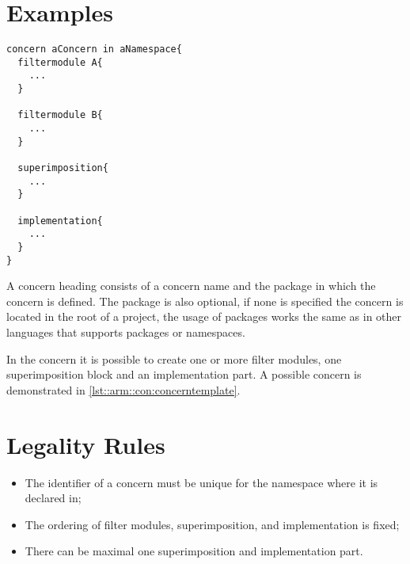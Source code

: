 \section*{Examples}
\begin{lstlisting}[language={Composestar},style=floatlisting, caption={Abstract example of a concern},label={lst::arm::con:concerntemplate}, floatplacement=tbp]
concern aConcern in aNamespace{
  filtermodule A{
    ...
  }
  
  filtermodule B{
    ...
  }
  
  superimposition{
    ...
  }
  
  implementation{
    ...
  }
}
\end{lstlisting}
A concern heading consists of a concern name%
and the package in which the concern is defined. The package is also optional, if none is specified the concern is located in the root
of a project, the usage of packages works the same as in other languages that supports packages or namespaces.

In the concern it is possible to create one or more filter modules, one superimposition block
and an implementation part. A possible concern is demonstrated in \autoref{lst::arm::con:concerntemplate}.

\section*{Legality Rules}
\begin{itemize}[noitemsep]
\item The identifier of a concern must be unique for the namespace where it is declared in;
\item The ordering of filter modules, superimposition, and implementation is fixed;
\item There can be maximal one superimposition and implementation part.
\end{itemize}

\comments{}
\dotnetcomment{}
